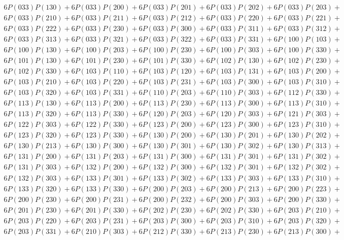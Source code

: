 \begin{align*}
	6P(033)P(130) + 6P(033)P(200) + 6P(033)P(201) + 6P(033)P(202) + 6P(033)P(203)+ \\
	6P(033)P(210) + 6P(033)P(211) + 6P(033)P(212) + 6P(033)P(220) + 6P(033)P(221)+ \\
	6P(033)P(222) + 6P(033)P(230) + 6P(033)P(300) + 6P(033)P(311) + 6P(033)P(312)+ \\
	6P(033)P(313) + 6P(033)P(321) + 6P(033)P(322) + 6P(033)P(331) + 6P(100)P(103)+ \\
	6P(100)P(130) + 6P(100)P(203) + 6P(100)P(230) + 6P(100)P(303) + 6P(100)P(330)+ \\
	6P(101)P(130) + 6P(101)P(230) + 6P(101)P(330) + 6P(102)P(130) + 6P(102)P(230)+ \\
	6P(102)P(330) + 6P(103)P(110) + 6P(103)P(120) + 6P(103)P(131) + 6P(103)P(200)+ \\
	6P(103)P(210) + 6P(103)P(220) + 6P(103)P(231) + 6P(103)P(300) + 6P(103)P(310)+ \\
	6P(103)P(320) + 6P(103)P(331) + 6P(110)P(203) + 6P(110)P(303) + 6P(112)P(330)+ \\
	6P(113)P(130) + 6P(113)P(200) + 6P(113)P(230) + 6P(113)P(300) + 6P(113)P(310)+ \\
	6P(113)P(320) + 6P(113)P(330) + 6P(120)P(203) + 6P(120)P(303) + 6P(121)P(303)+ \\
	6P(122)P(303) + 6P(122)P(330) + 6P(123)P(200) + 6P(123)P(300) + 6P(123)P(310)+ \\
	6P(123)P(320) + 6P(123)P(330) + 6P(130)P(200) + 6P(130)P(201) + 6P(130)P(202)+ \\
	6P(130)P(213) + 6P(130)P(300) + 6P(130)P(301) + 6P(130)P(302) + 6P(130)P(313)+ \\
	6P(131)P(200) + 6P(131)P(203) + 6P(131)P(300) + 6P(131)P(301) + 6P(131)P(302)+ \\
	6P(131)P(303) + 6P(132)P(200) + 6P(132)P(300) + 6P(132)P(301) + 6P(132)P(302)+ \\
	6P(132)P(303) + 6P(133)P(301) + 6P(133)P(302) + 6P(133)P(303) + 6P(133)P(310)+ \\
	6P(133)P(320) + 6P(133)P(330) + 6P(200)P(203) + 6P(200)P(213) + 6P(200)P(223)+ \\
	6P(200)P(230) + 6P(200)P(231) + 6P(200)P(232) + 6P(200)P(303) + 6P(200)P(330)+ \\
	6P(201)P(230) + 6P(201)P(330) + 6P(202)P(230) + 6P(202)P(330) + 6P(203)P(210)+ \\
	6P(203)P(220) + 6P(203)P(231) + 6P(203)P(300) + 6P(203)P(310) + 6P(203)P(320)+ \\
	6P(203)P(331) + 6P(210)P(303) + 6P(212)P(330) + 6P(213)P(230) + 6P(213)P(300)+ \\

\end{align*}
